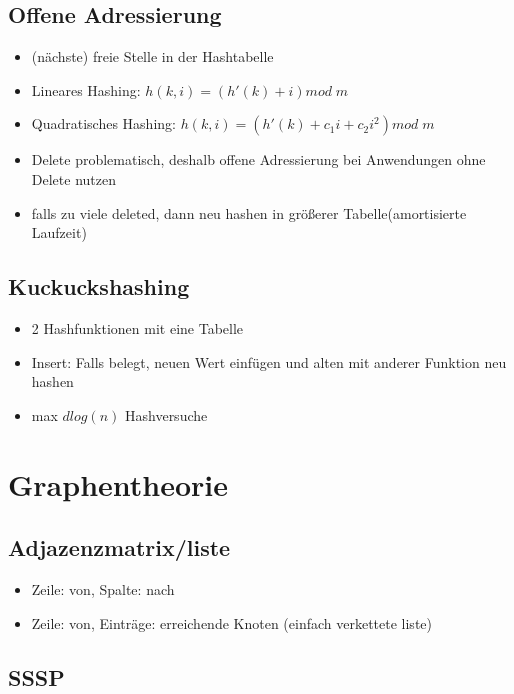 \documentclass{article}
\begin{document}
\subsection{Offene Adressierung}
\begin{itemize}
\item (nächste) freie Stelle in der Hashtabelle
\item Lineares Hashing: $h(k,i) = (h'(k) +i) mod \; m$
\item Quadratisches Hashing: $h(k,i) = (h'(k) +c_1i+ c_2 i^2) mod \; m$
\item Delete problematisch, deshalb offene Adressierung bei Anwendungen ohne Delete nutzen
\item falls zu viele deleted, dann neu hashen in größerer Tabelle(amortisierte Laufzeit)
\end{itemize}

\subsection{Kuckuckshashing}
\begin{itemize}
\item 2 Hashfunktionen mit eine Tabelle
\item Insert: Falls belegt, neuen Wert einfügen und alten mit anderer Funktion neu hashen
\item max $d log(n)$ Hashversuche
\end{itemize}


\section{Graphentheorie}
\subsection{Adjazenzmatrix/liste}
\begin{itemize}
\item Zeile: von, Spalte: nach
\item Zeile: von, Einträge: erreichende Knoten (einfach verkettete liste)
\end{itemize}

\subsection{SSSP}
\end{document}
